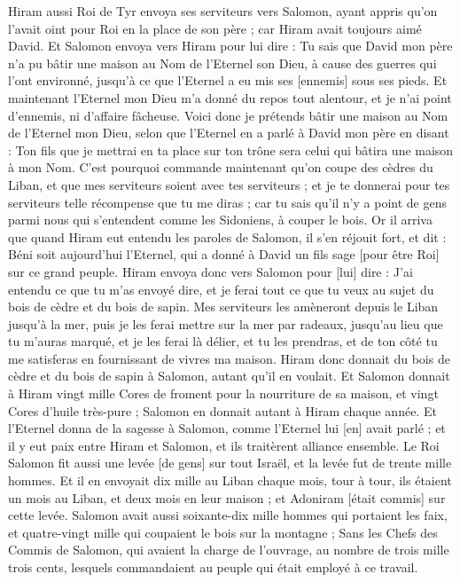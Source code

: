\begin{multicols}{2}
\VerseOne{}Hiram aussi Roi de Tyr envoya ses serviteurs vers Salomon, ayant appris qu'on l'avait oint pour Roi en la place de son père ; car Hiram avait toujours aimé David.
Et Salomon envoya vers Hiram pour lui dire :
Tu sais que David mon père n'a pu bâtir une maison au Nom de l'Eternel son Dieu, à cause des guerres qui l'ont environné, jusqu'à ce que l'Eternel a eu mis ses [ennemis] sous ses pieds.
Et maintenant l'Eternel mon Dieu m'a donné du repos tout alentour, et je n'ai point d'ennemis, ni d'affaire fâcheuse.
Voici donc je prétends bâtir une maison au Nom de l'Eternel mon Dieu, selon que l'Eternel en a parlé à David mon père en disant : Ton fils que je mettrai en ta place sur ton trône sera celui qui bâtira une maison à mon Nom.
C'est pourquoi commande maintenant qu'on coupe des cèdres du Liban, et que mes serviteurs soient avec tes serviteurs ; et je te donnerai pour tes serviteurs telle récompense que tu me diras ; car tu sais qu'il n'y a point de gens parmi nous qui s'entendent comme les Sidoniens, à couper le bois.
Or il arriva que quand Hiram eut entendu les paroles de Salomon, il s'en réjouit fort, et dit : Béni soit aujourd'hui l'Eternel, qui a donné à David un fils sage [pour être Roi] sur ce grand peuple.
Hiram envoya donc vers Salomon pour [lui] dire : J'ai entendu ce que tu m'as envoyé dire, et je ferai tout ce que tu veux au sujet du bois de cèdre et du bois de sapin.
Mes serviteurs les amèneront depuis le Liban jusqu'à la mer, puis je les ferai mettre sur la mer par radeaux, jusqu'au lieu que tu m'auras marqué, et je les ferai là délier, et tu les prendras, et de ton côté tu me satisferas en fournissant de vivres ma maison.
Hiram donc donnait du bois de cèdre et du bois de sapin à Salomon, autant qu'il en voulait.
Et Salomon donnait à Hiram vingt mille Cores de froment pour la nourriture de sa maison, et vingt Cores d'huile très-pure ; Salomon en donnait autant à Hiram chaque année.
Et l'Eternel donna de la sagesse à Salomon, comme l'Eternel lui [en] avait parlé ; et il y eut paix entre Hiram et Salomon, et ils traitèrent alliance ensemble.
Le Roi Salomon fit aussi une levée [de gens] sur tout Israël, et la levée fut de trente mille hommes.
Et il en envoyait dix mille au Liban chaque mois, tour à tour, ils étaient un mois au Liban, et deux mois en leur maison ; et Adoniram [était commis] sur cette levée.
Salomon avait aussi soixante-dix mille hommes qui portaient les faix, et quatre-vingt mille qui coupaient le bois sur la montagne ;
Sans les Chefs des Commis de Salomon, qui avaient la charge de l'ouvrage, au nombre de trois mille trois cents, lesquels commandaient au peuple qui était employé à ce travail.

\end{multicols}
